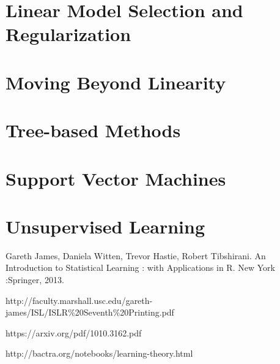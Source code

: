 \documentclass{article}
\newcommand{\comment}[1]{}
\numberwithin{equation}{section}
\begin{document}
\begin{enumerate}
\newpage
\section{Linear Model Selection and Regularization}

\newpage
\section{Moving Beyond Linearity}

\newpage
\section{Tree-based Methods}

\newpage
\section{Support Vector Machines}

\newpage
\section{Unsupervised Learning}

\end{enumerate}


\comment{
- left off: pg 47, video:  Lect3 4b 110613
- 
}


\newpage
\begin{thebibliography}{}
\bibitem[]{}
Gareth James, Daniela Witten, Trevor Hastie, Robert Tibshirani. An Introduction to Statistical Learning : with Applications in R. New York :Springer, 2013.


http://faculty.marshall.usc.edu/gareth-james/ISL/ISLR\%20Seventh\%20Printing.pdf



\bibitem[]{}
https://arxiv.org/pdf/1010.3162.pdf

\bibitem[]{}
http://bactra.org/notebooks/learning-theory.html

\end{thebibliography}
\end{document}

